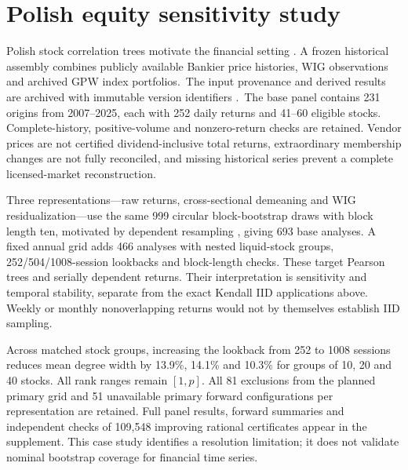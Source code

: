 \section{Polish equity sensitivity study}\label{sec:gpw}
Polish stock correlation trees motivate the financial setting \citep{galazka2011}. A frozen historical assembly combines publicly available Bankier price histories, WIG observations and archived GPW index portfolios.\ifanonymous\else\ The input provenance and derived results are archived with immutable version identifiers \citep{previouscode}.\fi\ The base panel contains 231 origins from 2007--2025, each with 252 daily returns and 41--60 eligible stocks. Complete-history, positive-volume and nonzero-return checks are retained. Vendor prices are not certified dividend-inclusive total returns, extraordinary membership changes are not fully reconciled, and missing historical series prevent a complete licensed-market reconstruction.

Three representations---raw returns, cross-sectional demeaning and WIG residualization---use the same 999 circular block-bootstrap draws with block length ten, motivated by dependent resampling \citep{kunsch1989}, giving 693 base analyses. A fixed annual grid adds 466 analyses with nested liquid-stock groups, 252/504/1008-session lookbacks and block-length checks. These target Pearson trees and serially dependent returns. Their interpretation is sensitivity and temporal stability, separate from the exact Kendall IID applications above. Weekly or monthly nonoverlapping returns would not by themselves establish IID sampling.

Across matched stock groups, increasing the lookback from 252 to 1008 sessions reduces mean degree width by 13.9\%, 14.1\% and 10.3\% for groups of 10, 20 and 40 stocks. All rank ranges remain $[1,p]$. All 81 exclusions from the planned primary grid and 51 unavailable primary forward configurations per representation are retained. Full panel results, forward summaries and independent checks of 109,548 improving rational certificates appear in the supplement. This case study identifies a resolution limitation; it does not validate nominal bootstrap coverage for financial time series.
